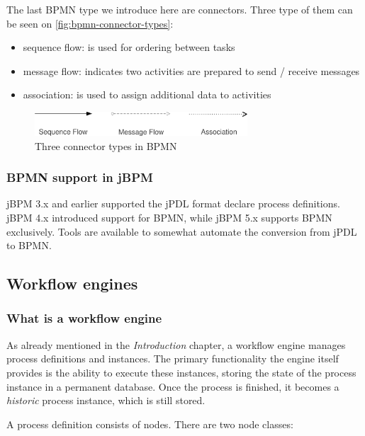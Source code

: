 The last BPMN type we introduce here are connectors. Three type of them can be
seen on \autoref{fig:bpmn-connector-types}:

\begin{itemize}
\item sequence flow: is used for ordering between tasks
\item message flow: indicates two activities are prepared to send / receive messages
\item association: is used to assign additional data to activities
\end{itemize}

\begin{figure}[H]
\centering
\includegraphics[width=300px,keepaspectratio]{bpmn-connector-types.pdf}
\caption{Three connector types in BPMN}
\label{fig:bpmn-connector-types}
\end{figure}

\subsubsection*{BPMN support in jBPM}

jBPM 3.x and earlier supported the jPDL format declare process definitions.
jBPM 4.x introduced support for BPMN, while jBPM 5.x supports BPMN exclusively.
Tools are available to somewhat automate the conversion from jPDL to BPMN.

\subsection{Workflow engines}

\subsubsection*{What is a workflow engine}

As already mentioned in the \emph{Introduction} chapter, a workflow engine
manages process definitions and instances. The primary functionality the engine
itself provides is the ability to execute these instances, storing the state of
the process instance in a permanent database. Once the process is finished, it
becomes a \emph{historic} process instance, which is still stored.

A process definition consists of nodes. There are two node classes:

